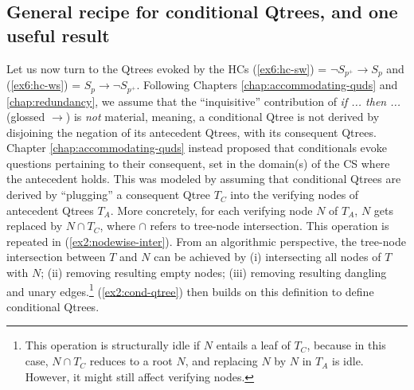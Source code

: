 


\subsection{General recipe for conditional Qtrees, and one useful result}

Let us now turn to the Qtrees evoked by the HCs (\ref{ex6:hc-sw}) = $\neg S_{p^+} \rightarrow S_{p}$  and (\ref{ex6:hc-ws}) = $S_p \rightarrow \neg S_{p^+}$. Following Chapters \ref{chap:accommodating-quds} and \ref{chap:redundancy}, we assume that the ``inquisitive'' contribution of \textit{if ... then ...} (glossed $\rightarrow$) is \textit{not} material, meaning, a conditional Qtree is not derived by disjoining the negation of its antecedent Qtrees, with its consequent Qtrees.\\


Chapter \ref{chap:accommodating-quds} instead proposed that conditionals evoke questions pertaining to their consequent, set in the domain(s) of the CS where the antecedent holds. This was modeled by assuming that conditional Qtrees are derived by ``plugging'' a consequent Qtree $T_C$ into the verifying nodes of antecedent Qtrees $T_A$. More concretely, for each verifying node $N$ of $T_A$, $N$ gets replaced by $N \cap T_C$, where $\cap$ refers to tree-node intersection. This operation is repeated in (\ref{ex2:nodewise-inter}). From an algorithmic perspective, the tree-node intersection between $T$ and $N$ can be achieved by (i) intersecting all nodes of $T$ with $N$; (ii) removing resulting empty nodes; (iii) removing resulting dangling and unary edges.\footnote{This operation is structurally idle if $N$ entails a leaf of $T_C$, because in this case, $N \cap T_C$ reduces to a root $N$, and replacing $N$ by $N$ in $T_A$ is idle. However, it might still affect verifying nodes.} (\ref{ex2:cond-qtree}) then builds on this definition to define conditional Qtrees.

